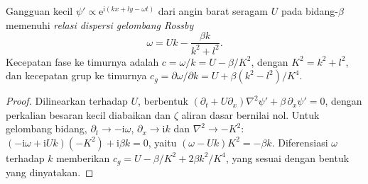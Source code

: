 \begin{theorem}\label{thm:b3:atmospheric-dynamics:rossby}
Gangguan kecil $\psi' \propto \mathrm e^{\mathrm i(kx + ly - \omega t)}$
dari angin barat seragam $U$ pada bidang-$\beta$ memenuhi
\emph{relasi dispersi gelombang Rossby}
\[
\omega = Uk - \frac{\beta k}{k^2 + l^2} .
\]
Kecepatan fase ke timurnya adalah $c = \omega/k = U - \beta/K^2$, dengan $K^2 =
k^2 + l^2$, dan kecepatan grup ke timurnya $c_g = \partial\omega/\partial
k = U + \beta(k^2 - l^2)/K^4$.
\end{theorem}

\begin{proof}
Dilinearkan terhadap $U$,  berbentuk
$(\partial_t + U\partial_x)\nabla^2\psi' + \beta\,\partial_x\psi' = 0$, dengan
perkalian besaran kecil diabaikan dan $\zeta$ aliran dasar
bernilai nol. Untuk gelombang bidang, $\partial_t \to -\mathrm i\omega$,
$\partial_x \to \mathrm ik$ dan $\nabla^2 \to -K^2$: $(-\mathrm i\omega +
\mathrm iUk)(-K^2) + \mathrm i\beta k = 0$, yaitu $(\omega - Uk)K^2 =
-\beta k$. Diferensiasi $\omega$ terhadap $k$ memberikan $c_g = U -
\beta/K^2 + 2\beta k^2/K^4$, yang sesuai dengan bentuk yang dinyatakan.
\end{proof}


